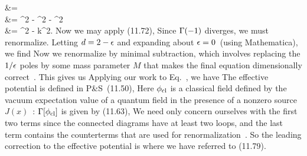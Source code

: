 \documentclass[11pt]{article}
\begin{document}
{{ 		&= \det {} \\
 		&= \sig^2 - \kso^2 - \ksq^2 \\
 		&= \sig^2 - k^2.
 	}
 	Now we may apply (11.72),
 	Since $\Gamma(-1)$ diverges, we must renormalize.  Letting $d = 2 - \epsilon$ and expanding about $\epsilon = 0$~(using Mathematica), we find
 	Now we renormalize by minimal subtraction, which involves replacing the $1 / \epsilon$ poles by some mass parameter $M$ that makes the final equation dimensionally correct~\cite[pp.~376--377]{Peskin}.  This gives us
  	Applying our work to Eq.~, we have
 	The effective potential is defined in P\&S~(11.50),
	Here $\phi_\text{cl}$ is a classical field defined by the vacuum expectation value of a quantum field in the presence of a nonzero source $J(x)$~\cite[p.~348]{Peskin}:
	$\Gamma[\phi_\text{cl}]$ is given by (11.63),
 	We need only concern ourselves with the first two terms since the connected diagrams have at least two loops, and the last term contains the counterterms that are used for renormalization~\cite[p.~372]{Peskin}.  So the leading correction to the effective potential is
 	where we have referred to (11.79).
}
\end{document}
